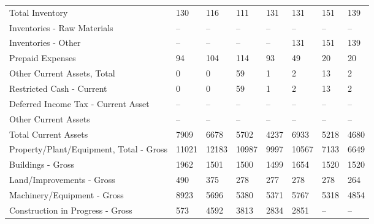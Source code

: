 \documentclass[grad,numbers]{coppe}
\begin{document}
\begin{longtable}[t]{llllllll}
  \hspace{1em}Total Inventory & 130 & 116 & 111 & 131 & 131 & 151 & 139\\
  \hspace{1em}\hspace{1em}Inventories - Raw Materials & -- & -- & -- & -- & -- & -- & --\\
  \hspace{1em}\hspace{1em}Inventories - Other & -- & -- & -- & -- & 131 & 151 & 139\\
  \hspace{1em}Prepaid Expenses & 94 & 104 & 114 & 93 & 49 & 20 & 20\\
  \hspace{1em}Other Current Assets, Total & 0 & 0 & 59 & 1 & 2 & 13 & 2\\
  \hspace{1em}\hspace{1em}Restricted Cash - Current & 0 & 0 & 59 & 1 & 2 & 13 & 2\\
  \hspace{1em}\hspace{1em}Deferred Income Tax - Current Asset & -- & -- & -- & -- & -- & -- & --\\
  \hspace{1em}\hspace{1em}Other Current Assets & -- & -- & -- & -- & -- & -- & --\\
  \hspace{1em}Total Current Assets & 7909 & 6678 & 5702 & 4237 & 6933 & 5218 & 4680\\
  \hspace{1em}Property/Plant/Equipment, Total - Gross & 11021 & 12183 & 10987 & 9997 & 10567 & 7133 & 6649\\
  \hspace{1em}\hspace{1em}Buildings - Gross & 1962 & 1501 & 1500 & 1499 & 1654 & 1520 & 1520\\
  \hspace{1em}\hspace{1em}Land/Improvements - Gross & 490 & 375 & 278 & 277 & 278 & 278 & 264\\
  \hspace{1em}\hspace{1em}Machinery/Equipment - Gross & 8923 & 5696 & 5380 & 5371 & 5767 & 5318 & 4854\\
  \hspace{1em}\hspace{1em}Construction in Progress - Gross & 573 & 4592 & 3813 & 2834 & 2851 & -- & --\\

\end{longtable}
\end{document}
